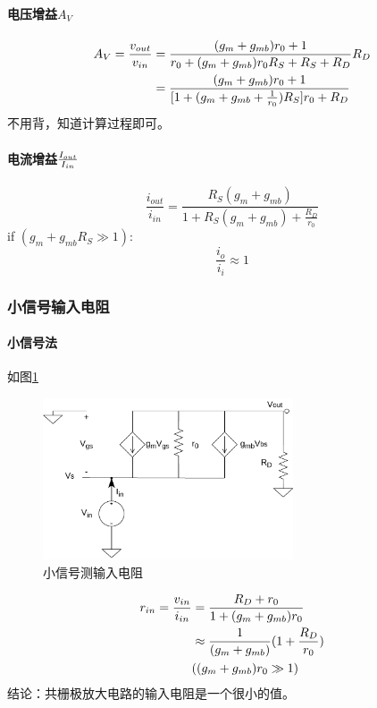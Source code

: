 \documentclass[twoside,a4paper,openright,titlepage,draft]{ctexrep}
\begin{document}
\paragraph{电压增益$A_V$}
\begin{align}
    A_V = \frac{v_{out}}{v_{in}} &= \frac{(g_m + g_{mb})r_0 + 1}{r_0 + (g_m + g_{mb})r_0R_S + R_S + R_D}R_D \notag \\
    &= \frac{(g_m + g_{mb})r_0 + 1}{[1 + (g_m + g_{mb} + \frac{1}{r_0})R_S]r_0 + R_D}
\end{align}
不用背，知道计算过程即可。
\paragraph{电流增益$I_{out} \over I_{in}$}
\begin{equation}
    \frac{i_{out}}{i_{in}} = \frac{R_S(g_m + g_{mb})}{1 + R_S(g_m + g_{mb}) + \frac{R_D}{r_0}}
\end{equation}
if $(g_m + g_{mb}R_S \gg 1)$:
\begin{equation}
    \frac{i_o}{i_i} \approx 1
\end{equation}
\subsubsection{小信号输入电阻}
\paragraph{小信号法}
如图\ref{fig:小信号测输入电阻}
\begin{figure}[H]
    \centering
    \includegraphics[width=0.66\textwidth]{inputimpedence.drawio.pdf}
    \caption{小信号测输入电阻}
    \label{fig:小信号测输入电阻}
\end{figure}
\begin{align}
    r_{in} = \frac{v_{in}}{i_{in}} &= \frac{R_D + r_0}{1 + (g_m + g_{mb})r_0} \\
    &\approx \frac{1}{(g_m + g_{mb})}(1 + \frac{R_D}{r_0}) \\
    &((g_m + g_{mb})r_0 \gg 1) \notag
\end{align}
结论：共栅极放大电路的输入电阻是一个很小的值。
\end{document}
